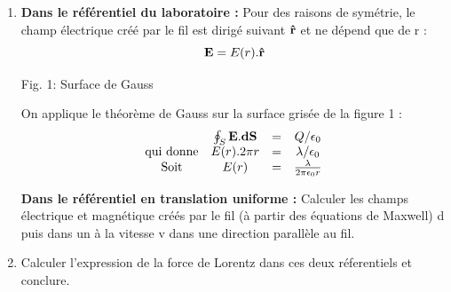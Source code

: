 \begin{enumerate}
En égalant l'expression des forces de Lorentz obtenuent dans chacun des référentiels, on obtient :
\[
{\bf E'} + {\bf u'} \land {\bf B'} = {\bf E} + {\bf u} \land {\bf B}
\]
Dans le référentiel ou la charge est au repos, {\bf u'} est nul, on a donc :
\[
{\bf E'} = {\bf E} + {\bf u} \land {\bf B}
\]
${\bf u} \land {\bf B}$ est le champ électromoteur.
 \item {\bf Dans le référentiel du laboratoire :} Pour des raisons de symétrie, le champ électrique créé par le fil est dirigé suivant ${\bf \hat{r}}$ et ne dépend que de r :
\[
{\bf E} = E(r).{\bf \hat{r}}
\]
\begin{minipage}[c]{.45\linewidth}
\begin{center}
\vspace{0.3cm}

\vspace{0.2cm}
Fig. 1: Surface de Gauss
\end{center}
\end{minipage}
\hfill
\begin{minipage}[c]{.45\linewidth}
 On applique le théorème de Gauss sur la surface grisée de la figure 1 : 
\[
\begin{array}{ c c c c }
 & \oint_{S}{\bf E}.{\bf dS} & = & Q / \epsilon_0 \\
\text{qui donne}  & E(r).2\pi r & = & \lambda / \epsilon_0 \\
\text{Soit}  & E(r)  &  = &  \frac{\lambda}{2\pi\epsilon_0 r} 
\end{array}
\]
\end{minipage}

\hspace{1.5cm}
{\bf Dans le référentiel en translation uniforme :}
Calculer les champs électrique et magnétique créés par le fil (à partir des équations de
Maxwell) d puis dans un 
à la vitesse v dans une direction parallèle au fil.
  \item Calculer l'expression de la force de Lorentz dans ces deux réferentiels et conclure.
\end{enumerate}

